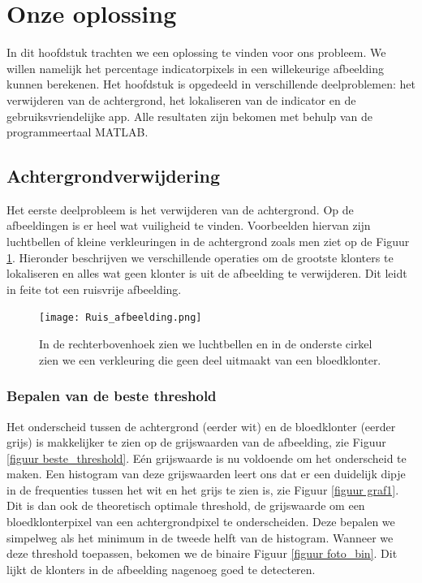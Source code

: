 \documentclass[a4paper,kulak]{kulakarticle}
\begin{document}
\section{Onze oplossing}
In dit hoofdstuk trachten we een oplossing te vinden voor ons probleem. We willen namelijk het percentage indicatorpixels in een willekeurige afbeelding kunnen berekenen. Het hoofdstuk is opgedeeld in verschillende deelproblemen: het verwijderen van de achtergrond, het lokaliseren van de indicator en de gebruiksvriendelijke app. Alle resultaten zijn bekomen met behulp van de programmeertaal MATLAB.


\subsection{Achtergrondverwijdering} \label{Achtergrondverwijdering}
Het eerste deelprobleem is het verwijderen van de achtergrond. Op de afbeeldingen is er heel wat vuiligheid te vinden. Voorbeelden hiervan zijn luchtbellen of kleine verkleuringen in de achtergrond zoals men ziet op de Figuur \ref{figuur achtergrondverwijdering}. Hieronder beschrijven we verschillende operaties om de grootste klonters te lokaliseren en alles wat geen klonter is uit de afbeelding te verwijderen. Dit leidt in feite tot een ruisvrije afbeelding.

\begin{figure}[H]
	\centering
	\texttt{[image: Ruis\_afbeelding.png]}	
	\caption{In de rechterbovenhoek zien we luchtbellen en in de onderste cirkel zien we een verkleuring die geen deel uitmaakt van een bloedklonter.}
	\label{figuur achtergrondverwijdering}
\end{figure}

\subsubsection{Bepalen van de beste threshold}
Het onderscheid tussen de achtergrond (eerder wit) en de bloedklonter (eerder grijs) is makkelijker te zien op de grijswaarden van de afbeelding, zie Figuur \ref{figuur beste_threshold}. Eén grijswaarde is nu voldoende om het onderscheid te maken. Een histogram van deze grijswaarden leert ons dat er een duidelijk dipje in de frequenties tussen het wit en het grijs te zien is, zie Figuur \ref{figuur graf1}. Dit is dan ook de theoretisch optimale threshold, de grijswaarde om een bloedklonterpixel van een achtergrondpixel te onderscheiden. Deze bepalen we simpelweg als het minimum in de tweede helft van de histogram. Wanneer we deze threshold toepassen, bekomen we de binaire Figuur \ref{figuur foto_bin}. Dit lijkt de klonters in de afbeelding nagenoeg goed te detecteren.
\end{document}
